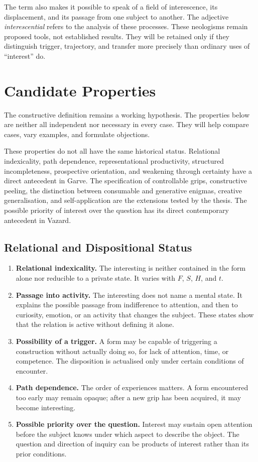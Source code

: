 \documentclass[11pt,a4paper]{article}
\begin{document}
The term also makes it possible to speak of a field of interescence, its
displacement, and its passage from one subject to another. The adjective
\emph{interescential} refers to the analysis of these processes. These
neologisms remain proposed tools, not established results. They will be retained
only if they distinguish trigger, trajectory, and transfer more precisely than
ordinary uses of ``interest'' do.

\section{Candidate Properties}

The constructive definition remains a working hypothesis. The properties below
are neither all independent nor necessary in every case. They will help compare
cases, vary examples, and formulate objections.

These properties do not all have the same historical status. Relational
indexicality, path dependence, representational productivity, structured
incompleteness, prospective orientation, and weakening through certainty have a
direct antecedent in Garve. The specification of controllable grips,
constructive peeling, the distinction between consumable and generative
enigmas, creative generalisation, and self-application are the extensions tested
by the thesis. The possible priority of interest over the question has its
direct contemporary antecedent in Vazard.

\subsection{Relational and Dispositional Status}

\begin{enumerate}
  \item \textbf{Relational indexicality.} The interesting is neither contained
        in the form alone nor reducible to a private state. It varies with
        \(F\), \(S\), \(H\), and \(t\).
  \item \textbf{Passage into activity.} The interesting does not name a mental
        state. It explains the possible passage from indifference to attention,
        and then to curiosity, emotion, or an activity that changes the subject.
        These states show that the relation is active without defining it alone.
  \item \textbf{Possibility of a trigger.} A form may be capable of triggering a
        construction without actually doing so, for lack of attention, time, or
        competence. The disposition is actualised only under certain conditions
        of encounter.
  \item \textbf{Path dependence.} The order of experiences matters. A form
        encountered too early may remain opaque; after a new grip has been
        acquired, it may become interesting.
  \item \textbf{Possible priority over the question.} Interest may sustain
        open attention before the subject knows under which aspect to describe
        the object. The question and direction of inquiry can be products of
        interest rather than its prior conditions.
\end{enumerate}
\end{document}
